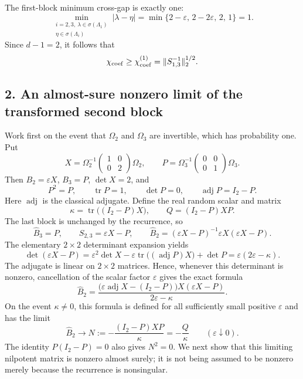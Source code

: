 \documentclass[10pt,a4paper]{article}
\begin{document}
The first-block minimum cross-gap is exactly one: \nopagebreak[3]
\[
\min_{\substack{i=2,3,\ \lambda\in\sigma(\Lambda_1)\\
                         \eta\in\sigma(\Lambda_i)}}
|\lambda-\eta|
=\min\{2-\varepsilon,\,2-2\varepsilon,\,2,\,1\}=1.
\] Since \(d-1=2\), it follows that \nopagebreak[3]
\[
\chi_{\rm coef}\geq\chi_{\rm coef}^{(1)}
=\|S_{1,3}^{-1}\|_2^{1/2}.
\]

\subsection{2. An almost-sure nonzero limit of the transformed second block}\label{an-almost-sure-nonzero-limit-of-the-transformed-second-block}

Work first on the event that \(\Omega_2\) and \(\Omega_3\) are invertible, which has probability one. Put \nopagebreak[3]
\[
X=\Omega_2^{-1}
\begin{pmatrix}1&0\\0&2\end{pmatrix}\Omega_2,
\qquad
P=\Omega_3^{-1}
\begin{pmatrix}0&0\\0&1\end{pmatrix}\Omega_3.
\] Then \(B_2=\varepsilon X\), \(B_3=P\), \(\det X=2\), and \nopagebreak[3]
\[
P^2=P,\qquad \operatorname{tr}P=1,\qquad
\det P=0,\qquad \operatorname{adj}P=I_2-P.
\] Here \(\operatorname{adj}\) is the classical adjugate. Define the real random scalar and matrix \nopagebreak[3]
\[
\kappa=\operatorname{tr}\bigl((I_2-P)X\bigr),
\qquad Q=(I_2-P)XP.
\] The last block is unchanged by the recurrence, so \nopagebreak[3]
\[
\widehat B_3=P,\qquad
S_{2,3}=\varepsilon X-P,\qquad
\widehat B_2=(\varepsilon X-P)^{-1}
                  \varepsilon X(\varepsilon X-P).
\] The elementary \(2\times2\) determinant expansion yields \nopagebreak[3]
\[
\det(\varepsilon X-P)
=\varepsilon^2\det X
 -\varepsilon\operatorname{tr}\bigl((\operatorname{adj}P)X\bigr)
 +\det P
=\varepsilon(2\varepsilon-\kappa).
\] The adjugate is linear on \(2\times2\) matrices. Hence, whenever this determinant is nonzero, cancellation of the scalar factor \(\varepsilon\) gives the exact formula \nopagebreak[3]
\[
\widehat B_2=
\frac{\bigl(\varepsilon\operatorname{adj}X-(I_2-P)\bigr)
             X(\varepsilon X-P)}
     {2\varepsilon-\kappa}.
\] On the event \(\kappa\ne0\), this formula is defined for all sufficiently small positive \(\varepsilon\) and has the limit \nopagebreak[3]
\[
\widehat B_2\longrightarrow
N:=-\frac{(I_2-P)XP}{\kappa}=-\frac Q\kappa
\qquad(\varepsilon\downarrow0).
\] The identity \(P(I_2-P)=0\) also gives \(N^2=0\). We next show that this limiting nilpotent matrix is nonzero almost surely; it is not being assumed to be nonzero merely because the recurrence is nonsingular.
\end{document}
